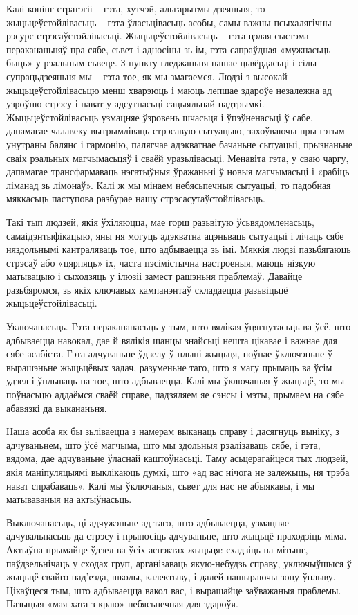 Калі копінг-стратэгіі – гэта, хутчэй, альгарытмы дзеяньня, то жыцьцеўстойлівасьць – гэта ўласьцівасьць асобы, самы важны псыхалягічны рэсурс стрэсаўстойлівасьці. Жыцьцеўстойлівасьць – гэта цэлая сыстэма перакананьняў пра сябе, сьвет і адносіны зь ім, гэта сапраўдная «мужнасьць быць» у рэальным сьвеце. З пункту гледжаньня нашае цьвёрдасьці і сілы супрацьдзеяньня мы – гэта тое, як мы змагаемся. Людзі з высокай жыцьцеўстойлівасьцю менш хварэюць і маюць лепшае здароўе незалежна ад узроўню стрэсу і нават у адсутнасьці сацыяльнай падтрымкі. Жыцьцеўстойлівасьць узмацняе ўзровень шчасьця і ўпэўненасьці ў сабе, дапамагае чалавеку вытрымліваць стрэсавую сытуацыю, захоўваючы пры гэтым унутраны балянс і гармонію, палягчае адэкватнае бачаньне сытуацыі, прызнаньне сваіх рэальных магчымасьцяў і сваёй уразьлівасьці. Менавіта гэта, у сваю чаргу, дапамагае трансфармаваць нэгатыўныя ўражаньні ў новыя магчымасьці і «рабіць ліманад зь лімонаў». Калі ж мы мінаем небясьпечныя сытуацыі, то падобная мяккасьць паступова разбурае нашу стрэсасутаўстойлівасьць.

Такі тып людзей, якія ўхіляюцца, мае горш разьвітую ўсьвядомленасьць, самаідэнтыфікацыю, яны ня могуць адэкватна ацэньваць сытуацыі і лічаць сябе няздольнымі кантраляваць тое, што адбываецца зь імі. Мяккія людзі пазьбягаюць стрэсаў або «цярпяць» іх, часта пэсімістычна настроеныя, маюць нізкую матывацыю і сыходзяць у ілюзіі замест рашэньня праблемаў. Давайце разьбяромся, зь якіх ключавых кампанэнтаў складаецца разьвіцьцё жыцьцеўстойлівасьці.

Уключанасьць. Гэта перакананасьць у тым, што вялікая ўцягнутасьць ва ўсё, што адбываецца навокал, дае й вялікія шанцы знайсьці нешта цікавае і важнае для сябе асабіста. Гэта адчуваньне ўдзелу ў плыні жыцьця, поўнае ўключэньне ў вырашэньне жыцьцёвых задач, разуменьне таго, што я магу прымаць ва ўсім удзел і ўплываць на тое, што адбываецца. Калі мы ўключаныя ў жыцьцё, то мы поўнасьцю аддаёмся сваёй справе, падзяляем яе сэнсы і мэты, прымаем на сябе абавязкі да выкананьня. 

Наша асоба як бы зьліваецца з намерам выканаць справу і дасягнуць выніку, з адчуваньнем, што ўсё магчыма, што мы здольныя рэалізаваць сябе, і гэта, вядома, дае адчуваньне ўласнай каштоўнасьці. Таму асьцерагайцеся тых людзей, якія маніпуляцыямі выклікаюць думкі, што «ад вас нічога не залежыць, ня трэба нават спрабаваць». Калі мы ўключаныя, сьвет для нас не абыякавы, і мы матываваныя на актыўнасьць.

Выключанасьць, ці адчужэньне ад таго, што адбываецца, узмацняе адчувальнасьць да стрэсу і прыносіць адчуваньне, што жыцьцё праходзіць міма. Актыўна прымайце ўдзел ва ўсіх аспэктах жыцьця: схадзіць на мітынг, паўдзельнічаць у сходах груп, арганізаваць якую-небудзь справу, уключыўшыся ў жыцьцё свайго пад'езда, школы, калектыву, і далей пашыраючы зону ўплыву. Цікаўцеся тым, што адбываецца вакол вас, і вырашайце заўважаныя праблемы. Пазыцыя «мая хата з краю» небясьпечная для здароўя.

